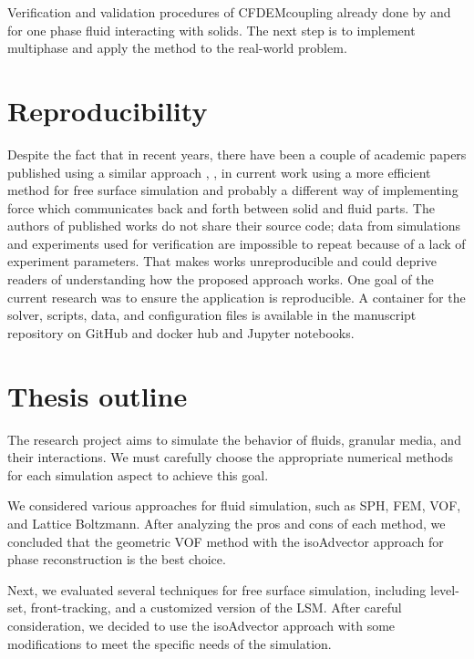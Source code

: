 Verification and validation procedures of CFDEMcoupling \cite{kloss2011liggghts} already done by \cite{hager2014cfd} and \cite{balachandran2021resolved} for one phase fluid interacting with solids. The next step is to implement multiphase and apply the method to the real-world problem.

\section{Reproducibility}

Despite the fact that in recent years, there have been a couple of academic papers published using a similar approach \cite{nan2023high}, \cite{mao2020resolved}, in current work using a more efficient method for free surface simulation and probably a different way of implementing force which communicates back and forth between solid and fluid parts. The authors of published works do not share their source code; data from simulations and experiments used for verification are impossible to repeat because of a lack of experiment parameters. That makes works unreproducible and could deprive readers of understanding how the proposed approach works. One goal of the current research was to ensure the application is reproducible. A container for the solver, scripts, data, and configuration files is available in the manuscript repository on GitHub \cite{github_solver} and docker hub \cite{docker} and Jupyter notebooks.

\section{Thesis outline}

The research project aims to simulate the behavior of fluids, granular media, and their interactions. We must carefully choose the appropriate numerical methods for each simulation aspect to achieve this goal.

We considered various approaches for fluid simulation, such as SPH, FEM, VOF, and Lattice Boltzmann. After analyzing the pros and cons of each method, we concluded that the geometric VOF method with the isoAdvector approach for phase reconstruction is the best choice.

Next, we evaluated several techniques for free surface simulation, including level-set, front-tracking, and a customized version of the LSM. After careful consideration, we decided to use the isoAdvector approach with some modifications to meet the specific needs of the simulation.

